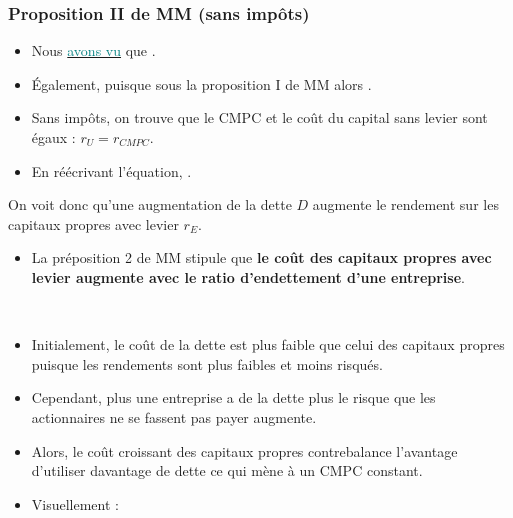 \documentclass[10pt, french]{article}
\begin{document}
\begin{multicols*}{2}
\subsubsection{Proposition II de MM (sans impôts)}
\begin{itemize}
	\item	Nous \hyperref[sec:wacc_def]{\textcolor{teal}{avons vu}} que .
	\item	Également, puisque sous la proposition I de MM  alors .
	\item	Sans impôts, on trouve que le CMPC et le coût du capital sans levier sont égaux : $r_{U}	=	r_{CMPC}$. 
	\item	En réécrivant l'équation, .
\end{itemize}

On voit donc qu'une augmentation de la dette $D$ augmente le rendement sur les capitaux propres avec levier $r_{E}$.
\begin{itemize}
	\item	La préposition 2 de MM stipule que \textbf{le coût des capitaux propres avec levier augmente avec le ratio d'endettement d'une entreprise}.
\end{itemize}

\

\begin{itemize}
	\item	Initialement, le coût de la dette est plus faible que celui des capitaux propres puisque les rendements sont plus faibles et moins risqués. 
	\item	Cependant, plus une entreprise a de la dette plus le risque que les actionnaires ne se fassent pas payer augmente. 
	\item	Alors, le coût croissant des capitaux propres contrebalance l'avantage d'utiliser davantage de dette ce qui mène à un CMPC constant.
	\item	Visuellement : 
\end{itemize}
\begin{center}

\begin{tikzpicture}[x=0.75pt,y=0.75pt,yscale=-1,xscale=1]


\end{tikzpicture}
\end{center}
\end{multicols*}
\end{document}
